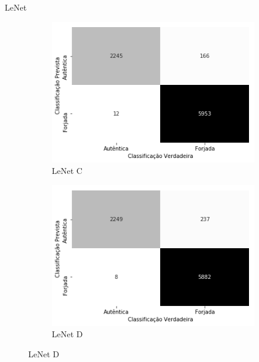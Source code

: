 \begin{frame}{LeNet}
\begin{figure}[ht!]
      \begin{subfigure}{0.25\linewidth}
        \caption{LeNet C}
        \includegraphics[width=\linewidth]{img/matriz-lenet-c}%
      \end{subfigure}
      \hspace{2cm}
      \begin{subfigure}{0.25\linewidth}
        \caption{LeNet D}
        \includegraphics[width=\linewidth]{img/matriz-lenet-d}%
      \end{subfigure}
  \end{figure}
\end{frame}



